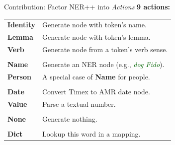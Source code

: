 \documentclass[hyperref]{beamer}
\def\darkgreen#1{\textcolor{darkgreen}{#1}}
\newcommand\w[1]{\textit{\darkgreen{#1}}}
\newcommand\hh[1]{\textbf{\textcolor[rgb]{0.5,0,0}{#1}}}
\begin{document}
\begin{frame}{Contribution: Factor NER++ into \textit{Actions}}
\hh{9 actions:}
\begin{center}
\begin{tabular}{ll}
\hh{Identity}  & Generate node with token's name. \\
\hh{Lemma}     & Generate node with token's lemma. \\
\hh{Verb}      & Generate node from a token's verb sense. \\
\\
\pause
\hh{Name}      & Generate an NER node (e.g., \w{dog Fido}). \\
\hh{Person}    & A special case of \textbf{Name} for people. \\
\\
\pause
\hh{Date}      & Convert Timex to AMR date node. \\
\hh{Value}     & Parse a textual number. \\
\\
\pause
\hh{None}      & Generate nothing. \\
\\
\pause
\hh{Dict}      & Lookup this word in a mapping. \\
\end{tabular}
\end{center}
\end{frame}
\end{document}
